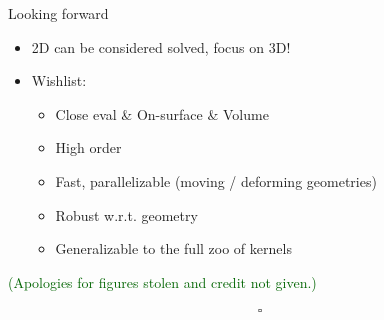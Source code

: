 \documentclass[t]{beamer}
\newcommand{\who}[1]{{\scriptsize \textcolor{darkgreen}{(#1)}}}  %
\begin{document}
\begin{frame}{Looking forward}
  \begin{itemize}
  \item 2D can be considered solved, focus on 3D!
  \item Wishlist:
    \begin{itemize}
    \item Close eval \& On-surface \& Volume
    \item High order
    \item Fast, parallelizable (moving / deforming geometries)
    \item Robust w.r.t. geometry
    \item Generalizable to the full zoo of kernels
    \end{itemize}
  \end{itemize}
  \vfill
  \who{Apologies for figures stolen and credit not given.}
\end{frame}

\begin{frame}[c]
  \begin{align}
    \square
  \end{align}
\end{frame}
\end{document}
